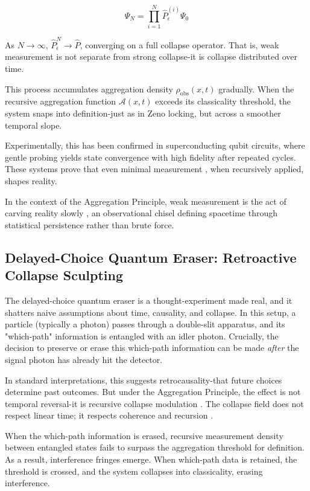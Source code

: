 \[
\Psi_N = \prod_{i=1}^N \hat{P}_\epsilon^{(i)} \Psi_0
\]

As \( N \to \infty \), \( \hat{P}_\epsilon^N \to \hat{P} \), converging on a full collapse operator. That is, weak measurement is not separate from strong collapse-it is collapse distributed over time.

This process accumulates aggregation density \( \rho_{\text{obs}}(x,t) \) gradually. When the recursive aggregation function \( \mathcal{A}(x,t) \) exceeds its classicality threshold, the system snaps into definition-just as in Zeno locking, but across a smoother temporal slope.

Experimentally, this has been confirmed in superconducting qubit circuits, where gentle probing yields state convergence with high fidelity after repeated cycles. These systems prove that  even minimal measurement , when recursively applied, shapes reality.

In the context of the Aggregation Principle, weak measurement is the act of  carving reality slowly , an observational chisel defining spacetime through statistical persistence rather than brute force.

\subsection{Delayed-Choice Quantum Eraser: Retroactive Collapse Sculpting}

The delayed-choice quantum eraser is a thought-experiment made real, and it shatters naive assumptions about time, causality, and collapse. In this setup, a particle (typically a photon) passes through a double-slit apparatus, and its "which-path" information is entangled with an idler photon. Crucially, the decision to preserve or erase this which-path information can be made \emph{after} the signal photon has already hit the detector.

In standard interpretations, this suggests retrocausality-that future choices determine past outcomes. But under the Aggregation Principle, the effect is not temporal reversal-it is  recursive collapse modulation . The collapse field does not respect linear time; it respects  coherence and recursion .

When the which-path information is erased, recursive measurement density between entangled states fails to surpass the aggregation threshold for definition. As a result, interference fringes emerge. When which-path data is retained, the threshold is crossed, and the system collapses into classicality, erasing interference.


